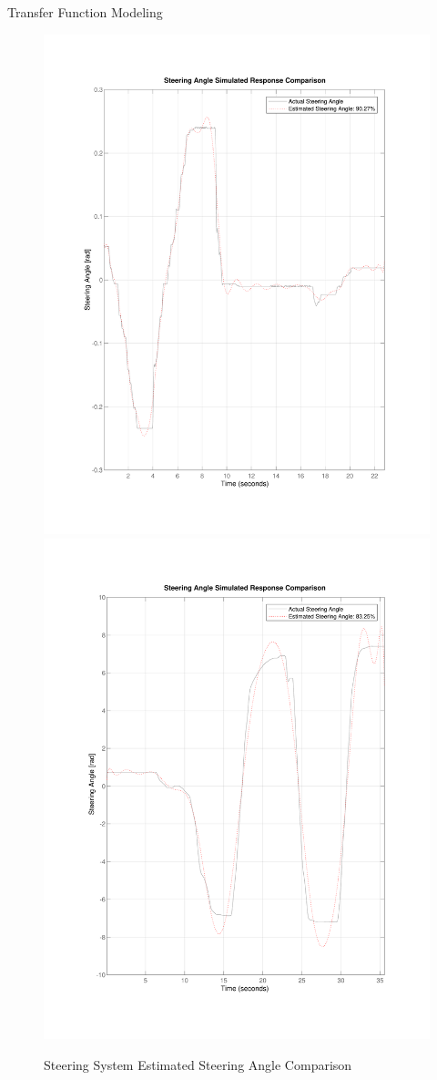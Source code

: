 \documentclass[final]{beamer}
\newlength{\onecolwid}
\begin{document}
\begin{frame}[t]
\begin{columns}[t]
\begin{column}{\onecolwid}
\begin{block}{Transfer Function Modeling}
\begin{itemize}
\end{itemize} 
\vskip -1cm
\begin{figure}
	\centering
	{\includegraphics[width=0.48\linewidth]{figs/img/byWireSteeringTransferFunctionModel}}
		{\includegraphics[width=0.48\linewidth]{figs/img/manualSteeringTransferFunctionModel}}
	\caption{Steering System Estimated Steering Angle Comparison}
\end{figure}


\end{block}
\end{column}
\end{columns}
\end{frame}
\end{document}
